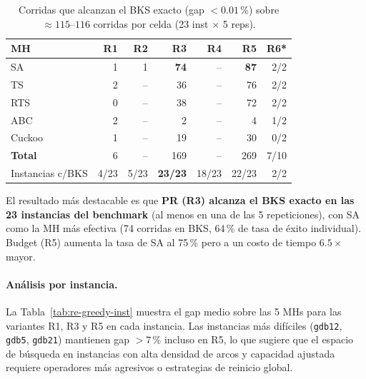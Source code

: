 \documentclass[11pt,a4paper]{article}
\theoremstyle{definition}
\theoremstyle{remark}
\begin{document}
\begin{table}[h]
\centering
\caption{Corridas que alcanzan el BKS exacto (gap $< 0.01$\,\%) sobre
         $\approx 115$--$116$ corridas por celda (23 inst $\times$ 5 reps).}
\label{tab:re-greedy-bks}
\small
\begin{tabular}{lrrrrrr}
\toprule
MH & R1 & R2 & R3 & R4 & R5 & R6* \\
\midrule
SA      &  1 &  1 & \textbf{74} &  -- & \textbf{87} & 2/2 \\
TS      &  2 &  -- & 36         &  -- & 76          & 2/2 \\
RTS     &  0 &  -- & 38         &  -- & 72          & 2/2 \\
ABC     &  2 &  -- &  2         &  -- &  4          & 1/2 \\
Cuckoo  &  1 &  -- & 19         &  -- & 30          & 0/2 \\
\midrule
\textbf{Total} & 6 & -- & 169 & -- & 269 & 7/10 \\
\midrule
Instancias c/BKS & 4/23 & 5/23 & \textbf{23/23} & 18/23 & 22/23 & 2/2 \\
\bottomrule
\end{tabular}
\end{table}

El resultado más destacable es que \textbf{PR (R3) alcanza el BKS exacto
en las 23 instancias del benchmark} (al menos en una de las 5
repeticiones), con SA como la MH más efectiva (74 corridas en BKS,
64\,\% de tasa de éxito individual). Budget (R5) aumenta la tasa de
SA al 75\,\% pero a un costo de tiempo $6.5\times$ mayor.

\paragraph{Análisis por instancia.}
La Tabla~\ref{tab:re-greedy-inst} muestra el gap medio sobre las 5 MHs
para las variantes R1, R3 y R5 en cada instancia. Las instancias más
difíciles (\texttt{gdb12}, \texttt{gdb5}, \texttt{gdb21}) mantienen
gap $> 7$\,\% incluso en R5, lo que sugiere que el espacio de búsqueda
en instancias con alta densidad de arcos y capacidad ajustada requiere
operadores más agresivos o estrategias de reinicio global.
\end{document}
